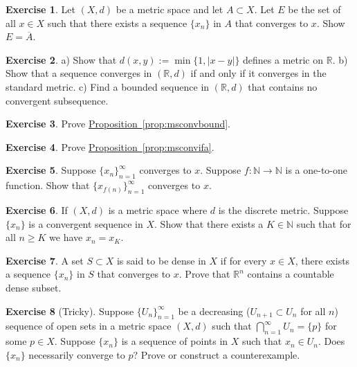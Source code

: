 \documentclass[12pt]{book}
\newcommand{\abs}[1]{\left\lvert {#1} \right\rvert}
\newcommand{\R}{{\mathbb{R}}}
\newcommand{\N}{{\mathbb{N}}}
\theoremstyle{plain}
\theoremstyle{remark}
\theoremstyle{definition}
\theoremstyle{exercise}
\newtheorem{exercise}{Exercise}[section]
\theoremstyle{example}
\newcommand{\propref}[1]{\hyperref[#1]{Proposition~\ref*{#1}}}
\begin{document}
\begin{exercise} \label{exercise:reverseclosedseq}
Let $(X,d)$ be a metric space and
let $A \subset X$.  Let $E$ be the set of all $x \in X$ such that there
exists a sequence $\{ x_n \}$ in $A$ that converges to $x$.  Show 
$E = \overline{A}$.
\end{exercise}

\begin{exercise}
a) Show that $d(x,y) := \min \{ 1, \abs{x-y} \}$ defines a metric on $\R$.
b) Show that a sequence converges in $(\R,d)$ if and only if it converges
in the standard metric.  c) Find a bounded sequence in $(\R,d)$ that
contains no convergent subsequence.
\end{exercise}

\begin{exercise}
Prove \propref{prop:msconvbound}.
\end{exercise}

\begin{exercise}
Prove \propref{prop:msconvifa}.
\end{exercise}

\begin{exercise}
Suppose $\{x_n\}_{n=1}^\infty$ converges to $x$.  Suppose $f \colon \N
\to \N$ is a one-to-one function.  Show that
$\{ x_{f(n)} \}_{n=1}^\infty$ converges to $x$.
\end{exercise}

\begin{exercise}
If $(X,d)$ is a metric space where $d$ is the discrete metric.  Suppose 
$\{ x_n \}$ is a convergent sequence in $X$.  Show that there exists
a $K \in \N$ such that for all $n \geq K$ we have $x_n = x_K$.
\end{exercise}

\begin{exercise}
A set $S \subset X$ is said to be dense in $X$ if for every $x \in X$,
there exists a sequence $\{ x_n \}$ in $S$ that converges to $x$.  Prove
that $\R^n$ contains a countable dense subset.
\end{exercise}

\begin{exercise}[Tricky]
Suppose $\{ U_n \}_{n=1}^\infty$ be a decreasing ($U_{n+1} \subset U_n$ for
all $n$) sequence of open sets in a metric space $(X,d)$ such that
$\bigcap_{n=1}^\infty U_n = \{ p \}$ for some $p \in X$.  Suppose 
$\{ x_n \}$ is a sequence of points in $X$ such that $x_n \in U_n$.  Does
$\{ x_n \}$ necessarily converge to $p$?  Prove or construct a counterexample.
\end{exercise}
\end{document}
